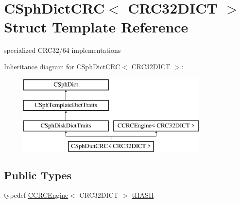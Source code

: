 \hypertarget{structCSphDictCRC}{\section{C\-Sph\-Dict\-C\-R\-C$<$ C\-R\-C32\-D\-I\-C\-T $>$ Struct Template Reference}
\label{structCSphDictCRC}
}


specialized C\-R\-C32/64 implementations  


Inheritance diagram for C\-Sph\-Dict\-C\-R\-C$<$ C\-R\-C32\-D\-I\-C\-T $>$\-:\begin{figure}[H]
\begin{center}
\leavevmode
\includegraphics[height=4.000000cm]{structCSphDictCRC}
\end{center}
\end{figure}
\subsection*{Public Types}
\begin{DoxyCompactItemize}
\item 
typedef \hyperlink{structCCRCEngine}{C\-C\-R\-C\-Engine}$<$ C\-R\-C32\-D\-I\-C\-T $>$ \hyperlink{structCSphDictCRC_ac85c11e03cdc57955cb5f515b39f23d1}{t\-H\-A\-S\-H}
\end{DoxyCompactItemize}
